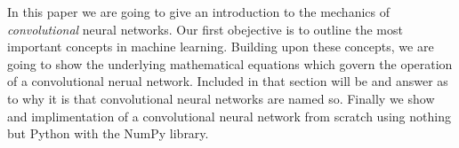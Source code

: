 \startsubject[title=Introduction]
In this paper we are going to give an introduction to the mechanics of {\em convolutional} neural networks.
Our first obejective is to outline the most important concepts in machine learning.
Building upon these concepts, we are going to show the underlying mathematical equations which govern the operation of a convolutional nerual network.
Included in that section will be and answer as to why it is that convolutional neural networks are named so.
Finally we show and implimentation of a convolutional neural network from scratch using nothing but Python with the NumPy library.
\stopsubject